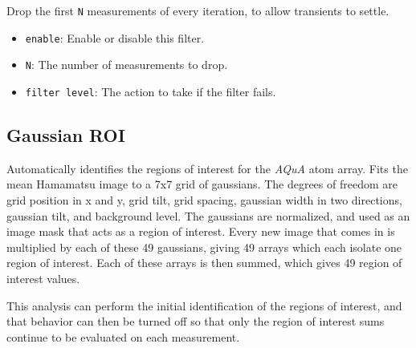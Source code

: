 \documentclass[pdftex,11pt,letterpaper]{article}
\begin{document}
Drop the first \texttt{N} measurements of every iteration, to allow transients to settle.

\begin{itemize}
\item \texttt{enable}:  Enable or disable this filter.
\item \texttt{N}:  The number of measurements to drop.
\item \texttt{filter level}:  The action to take if the filter fails.
\end{itemize}

\subsection{Gaussian ROI}

Automatically identifies the regions of interest for the \textit{AQuA} atom array.  Fits the mean Hamamatsu image to a 7x7 grid of gaussians.  The degrees of freedom are grid position in x and y, grid tilt, grid spacing, gaussian width in two directions, gaussian tilt, and background level.  The gaussians are normalized, and used as an image mask that acts as a region of interest.  Every new image that comes in is multiplied by each of these 49 gaussians, giving 49 arrays which each isolate one region of interest.  Each of these arrays is then summed, which gives 49 region of interest values.

This analysis can perform the initial identification of the regions of interest, and that behavior can then be turned off so that only the region of interest sums continue to be evaluated on each measurement.
\end{document}
